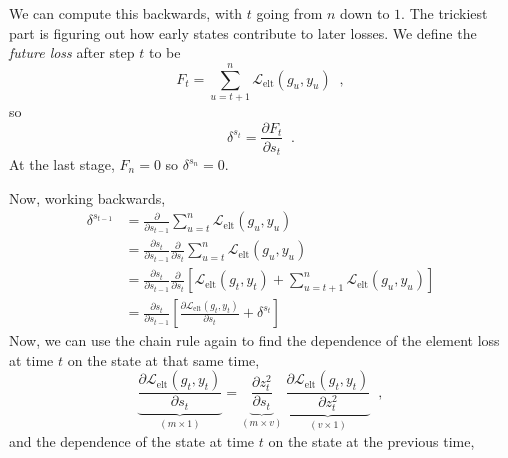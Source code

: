 \begin{enumerate}[(1)]
We can compute this backwards, with $t$ going from $n$ down to $1$. 
The trickiest part is figuring out how early states contribute to later
losses. We define the {\it{future loss}} after step $t$ to be
\begin{equation}
F_t = \sum_{u = t + 1}^{n}\mathcal{L}_\text{elt}(g_u, y_u) \;\;,
\end{equation}
so 
\begin{equation}
\delta^{s_t} = \frac{\partial F_t}{\partial s_t}\;\;.
\end{equation}
At the last stage, $F_n = 0$ so $\delta^{s_n} = 0$.

Now, working backwards, 
\begin{align}
\delta^{s_{t -1}} &= \frac{\partial}{\partial s_{t - 1}}\sum_{u = t}^n\mathcal{L}_\text{elt}(g_u, y_u)\\
&= \frac{\partial s_t}{\partial s_{t - 1}} \frac{\partial}{\partial s_t}\sum_{u = t}^n\mathcal{L}_\text{elt}(g_u, y_u)\\
&= \frac{\partial s_t}{\partial s_{t - 1}} \frac{\partial}{\partial s_t}\left[\mathcal{L}_\text{elt}(g_t, y_t) + \sum_{u = t + 1}^n\mathcal{L}_\text{elt}(g_u, y_u)\right]\\
&= \frac{\partial s_t}{\partial s_{t - 1}} \left[\frac{\partial \mathcal{L}_\text{elt}(g_t, y_t)}{\partial s_t} + \delta^{s_t}\right]
\end{align}
Now, we can use the chain rule again to find the dependence of the
element loss at time $t$ on the state  at that same time,
\begin{equation}
  \underbrace{\frac{\partial \mathcal{L}_\text{elt}(g_t,
    y_t)}{\partial s_t}}_{(m \times 1)} = \underbrace{\frac{\partial
    z_t^2}{\partial s_t}}_{(m \times v)} ~
\underbrace{\frac{\partial \mathcal{L}_\text{elt}(g_t, y_t)}{\partial
    z_t^2}}_{(v \times 1)}\;\;, 
\end{equation}
and the dependence of the state at time $t$ on the state at the
previous  time, 

\begin{equation}

\end{equation}
\end{enumerate}
